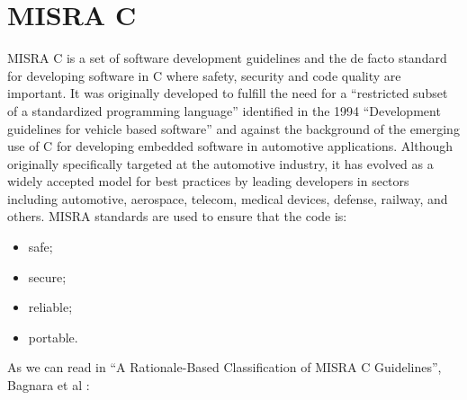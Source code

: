 \section{MISRA C}
MISRA C is a set of software development guidelines and the de facto standard for developing software in C where safety, security and code quality are important. 
It was originally developed to fulfill the need for a ``restricted subset of a standardized programming language'' identified in the 1994 ``Development guidelines for vehicle based software'' and against the background of the emerging use of C for developing embedded software in automotive applications.
Although originally specifically targeted at the automotive industry, it has evolved as a widely accepted model for best practices by leading developers in sectors including automotive, aerospace, telecom, medical devices, defense, railway, and others.
MISRA standards are used to ensure that the code is:
\begin{itemize}
  \item safe;
  \item secure;
  \item reliable;
  \item portable.
\end{itemize}
As we can read in ``A Rationale-Based Classification of MISRA C Guidelines'', Bagnara et al \cite{BagnaraBH22}:

